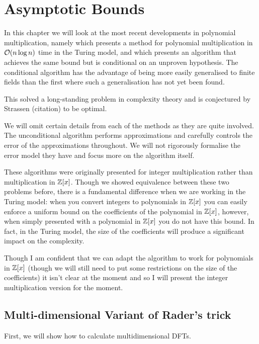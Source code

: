 \chapter{Asymptotic Bounds}\label{ch:asymptotic-bounds}

In this chapter we will look at the most recent developments in polynomial multiplication, namely \cite{nlogn} which presents a method for polynomial multiplication in $\mathcal O(n \log n)$ time in the Turing model, and \cite{ffnlogn} which presents an algorithm that achieves the same bound but is conditional on an unproven hypothesis. The conditional algorithm has the advantage of being more easily generalised to finite fields than the first where such a generalisation has not yet been found.

This solved a long-standing problem in complexity theory and is conjectured by Strassen (citation) to be optimal.

We will omit certain details from each of the methods as they are quite involved. The unconditional algorithm performs approximations and carefully controls the error of the approximations throughout. We will not rigorously formalise the error model they have and focus more on the algorithm itself.

These algorithms were originally presented for integer multiplication rather than multiplication in ${\mathbb Z}[x]$. Though we showed equivalence between these two problems before, there is a fundamental difference when we are working in the Turing model: when you convert integers to polynomials in ${\mathbb Z}[x]$ you can easily enforce a uniform bound on the coefficients of the polynomial in ${\mathbb Z}[x]$, however, when simply presented with a polynomial in ${\mathbb Z}[x]$ you do not have this bound. In fact, in the Turing model, the size of the coefficients will produce a significant impact on the complexity. 

Though I am confident that we can adapt the algorithm to work for polynomials in ${\mathbb Z}[x]$ (though we will still need to put some restrictions on the size of the coefficients) it isn't clear at the moment and so I will present the integer multiplication version for the moment.

\section{Multi-dimensional Variant of Rader's trick}%
\label{sec:multi_dimensional_variant_of_rader_s_trick}

First, we will show how to calculate multidimensional DFTs.

